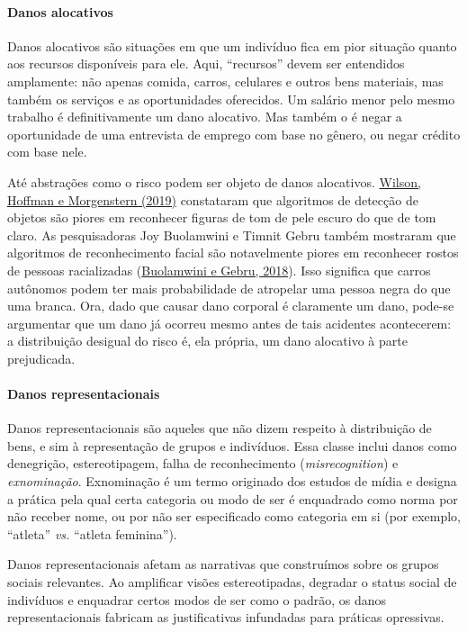 \documentclass[
  11pt,
]{article}
\begin{document}
\paragraph{Danos alocativos}\label{danos-alocativos}

Danos alocativos são situações em que um indivíduo fica em pior situação
quanto aos recursos disponíveis para ele. Aqui, ``recursos'' devem ser
entendidos amplamente: não apenas comida, carros, celulares e outros
bens materiais, mas também os serviços e as oportunidades oferecidos. Um
salário menor pelo mesmo trabalho é definitivamente um dano alocativo.
Mas também o é negar a oportunidade de uma entrevista de emprego com
base no gênero, ou negar crédito com base nele.

Até abstrações como o risco podem ser objeto de danos alocativos.
\href{http://arxiv.org/abs/1902.11097}{Wilson, Hoffman e Morgenstern
(2019)} constataram que algoritmos de detecção de objetos são piores em
reconhecer figuras de tom de pele escuro do que de tom claro. As
pesquisadoras Joy Buolamwini e Timnit Gebru também mostraram que
algoritmos de reconhecimento facial são notavelmente piores em
reconhecer rostos de pessoas racializadas
(\href{http://proceedings.mlr.press/v81/buolamwini18a/buolamwini18a.pdf}{Buolamwini
e Gebru, 2018}). Isso significa que carros autônomos podem ter mais
probabilidade de atropelar uma pessoa negra do que uma branca. Ora, dado
que causar dano corporal é claramente um dano, pode-se argumentar que um
dano já ocorreu mesmo antes de tais acidentes acontecerem: a
distribuição desigual do risco é, ela própria, um dano alocativo à parte
prejudicada.

\paragraph{Danos representacionais}\label{danos-representacionais}

Danos representacionais são aqueles que não dizem respeito à
distribuição de bens, e sim à representação de grupos e indivíduos. Essa
classe inclui danos como denegrição, estereotipagem, falha de
reconhecimento (\emph{misrecognition}) e \emph{exnominação}. Exnominação
é um termo originado dos estudos de mídia e designa a prática pela qual
certa categoria ou modo de ser é enquadrado como norma por não receber
nome, ou por não ser especificado como categoria em si (por exemplo,
``atleta'' \emph{vs.} ``atleta feminina'').

Danos representacionais afetam as narrativas que construímos sobre os
grupos sociais relevantes. Ao amplificar visões estereotipadas, degradar
o status social de indivíduos e enquadrar certos modos de ser como o
padrão, os danos representacionais fabricam as justificativas infundadas
para práticas opressivas.
\end{document}
